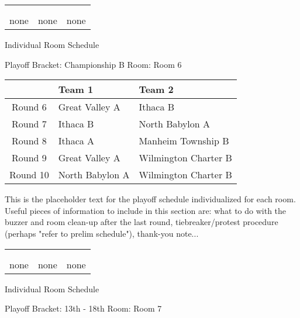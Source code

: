 \documentclass{article}%
\begin{document}
%
\begin{tabularx}{\textwidth}{YYY}%
  &  &  \\%
\\%
none&none&none\\%
\end{tabularx}%
\newpage%
\begin{center}%
\begin{Huge}%
Individual Room Schedule%
\end{Huge}%
\vspace*{16pt}%
\linebreak%
\begin{Large}%
Playoff Bracket: Championship B \hfill Room: Room 6%
\end{Large}%
\end{center}%
%
\begin{tabularx}{\textwidth}{|c|Y|Y|}%
\hline%
&Team 1&Team 2\\%
\hline%
Round 6&Great Valley A&Ithaca B\\%
Round 7&Ithaca B&North Babylon A\\%
Round 8&Ithaca A&Manheim Township B\\%
Round 9&Great Valley A&Wilmington Charter B\\%
Round 10&North Babylon A&Wilmington Charter B\\%
\hline%
\end{tabularx}%
\vspace*{16pt}%
\linebreak%
This is the placeholder text for the playoff schedule individualized for each room. Useful pieces of information to include in this section are: what to do with the buzzer and room clean{-}up after the last round, tiebreaker/protest procedure (perhaps "refer to prelim schedule"), thank{-}you note...%
\vspace*{30pt}%
\newline%
%
\begin{tabularx}{\textwidth}{YYY}%
  &  &  \\%
\\%
none&none&none\\%
\end{tabularx}%
\newpage%
\begin{center}%
\begin{Huge}%
Individual Room Schedule%
\end{Huge}%
\vspace*{16pt}%
\linebreak%
\begin{Large}%
Playoff Bracket: 13th - 18th \hfill Room: Room 7%
\end{Large}%
\end{center}%
\end{document}
